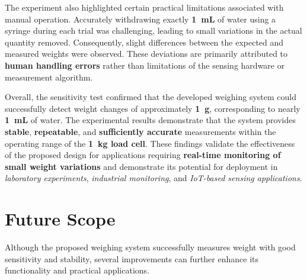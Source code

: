 The experiment also highlighted certain practical limitations associated with manual operation. Accurately withdrawing exactly \textbf{1~mL} of water using a syringe during each trial was challenging, leading to small variations in the actual quantity removed. Consequently, slight differences between the expected and measured weights were observed. These deviations are primarily attributed to \textbf{human handling errors} rather than limitations of the sensing hardware or measurement algorithm.

Overall, the sensitivity test confirmed that the developed weighing system could successfully detect weight changes of approximately \textbf{1~g}, corresponding to nearly \textbf{1~mL} of water. The experimental results demonstrate that the system provides \textbf{stable}, \textbf{repeatable}, and \textbf{sufficiently accurate} measurements within the operating range of the \textbf{1~kg load cell}. These findings validate the effectiveness of the proposed design for applications requiring \textbf{real-time monitoring of small weight variations} and demonstrate its potential for deployment in \emph{laboratory experiments}, \emph{industrial monitoring}, and \emph{IoT-based sensing applications}.




\section{Future Scope}

Although the proposed weighing system successfully measures weight with good sensitivity and stability, several improvements can further enhance its functionality and practical applications.

